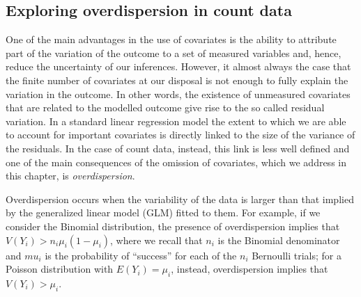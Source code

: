 \documentclass[
  letterpaper,
]{krantz}
\begin{document}
\subsection{Exploring overdispersion in count
data}\label{sec-overdispersion}

One of the main advantages in the use of covariates is the ability to
attribute part of the variation of the outcome to a set of measured
variables and, hence, reduce the uncertainty of our inferences. However,
it almost always the case that the finite number of covariates at our
disposal is not enough to fully explain the variation in the outcome. In
other words, the existence of unmeasured covariates that are related to
the modelled outcome give rise to the so called residual variation. In a
standard linear regression model the extent to which we are able to
account for important covariates is directly linked to the size of the
variance of the residuals. In the case of count data, instead, this link
is less well defined and one of the main consequences of the omission of
covariates, which we address in this chapter, is \emph{overdispersion}.

Overdispersion occurs when the variability of the data is larger than
that implied by the generalized linear model (GLM) fitted to them. For
example, if we consider the Binomial distribution, the presence of
overdispersion implies that \(V(Y_i) > n_i \mu_{i}(1-\mu_i)\), where we
recall that \(n_i\) is the Binomial denominator and \(mu_i\) is the
probability of ``success'' for each of the \(n_i\) Bernoulli trials; for
a Poisson distribution with \(E(Y_i) = \mu_i\), instead, overdispersion
implies that \(V(Y_i) > \mu_{i}\).
\end{document}
